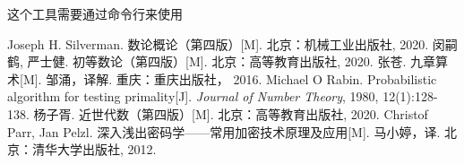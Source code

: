 \documentclass{book}
\numberwithin{equation}{subsubsection}
\begin{document}
这个工具需要通过命令行来使用
\newpage
\begin{thebibliography}{99}
     Joseph H. Silverman. 数论概论（第四版）[M]. 北京：机械工业出版社, 2020.
     闵嗣鹤, 严士健. 初等数论（第四版）[M]. 北京：高等教育出版社, 2020.  
     张苍. 九章算术[M]. 邹涌，译解. 重庆：重庆出版社， 2016.
     Michael O Rabin. Probabilistic algorithm for testing primality[J]. \textit{Journal of Number Theory}, 1980, 12(1):128-138.
     杨子胥. 近世代数（第四版）[M]. 北京：高等教育出版社, 2020.
     Christof Parr, Jan Pelzl. 深入浅出密码学——常用加密技术原理及应用[M]. 马小婷，译. 北京：清华大学出版社, 2012.
\end{thebibliography}
\end{document}
